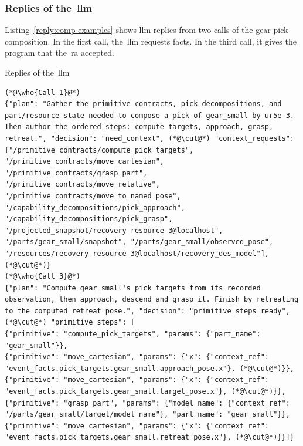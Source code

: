 \subsubsection{Replies of the~\texorpdfstring{\gls{llm}}{LLM}}\label{sec:comp-replies}

Listing~\ref{reply:comp-examples} shows \gls{llm} replies from two calls of the gear pick composition.
In the first call, the~\gls{llm} requests facts. In the third call, it gives the program that the~\gls{ra}
accepted.

\begin{recbox}{Replies of the~\gls{llm}}
\begin{lstlisting}
(*@\who{Call 1}@*)
{"plan": "Gather the primitive contracts, pick decompositions, and part/resource state needed to compose a pick of gear_small by ur5e-3. Then author the ordered steps: compute targets, approach, grasp, retreat.", "decision": "need_context", (*@\cut@*) "context_requests": ["/primitive_contracts/compute_pick_targets", "/primitive_contracts/move_cartesian", "/primitive_contracts/grasp_part", "/primitive_contracts/move_relative", "/primitive_contracts/move_to_named_pose", "/capability_decompositions/pick_approach", "/capability_decompositions/pick_grasp", "/projected_snapshot/recovery-resource-3@localhost", "/parts/gear_small/snapshot", "/parts/gear_small/observed_pose", "/resources/recovery-resource-3@localhost/recovery_des_model"], (*@\cut@*)}
(*@\who{Call 3}@*)
{"plan": "Compute gear_small's pick targets from its recorded observation, then approach, descend and grasp it. Finish by retreating to the computed retreat pose.", "decision": "primitive_steps_ready", (*@\cut@*) "primitive_steps": [
{"primitive": "compute_pick_targets", "params": {"part_name": "gear_small"}},
{"primitive": "move_cartesian", "params": {"x": {"context_ref": "event_facts.pick_targets.gear_small.approach_pose.x"}, (*@\cut@*)}},
{"primitive": "move_cartesian", "params": {"x": {"context_ref": "event_facts.pick_targets.gear_small.target_pose.x"}, (*@\cut@*)}},
{"primitive": "grasp_part", "params": {"model_name": {"context_ref": "/parts/gear_small/target/model_name"}, "part_name": "gear_small"}},
{"primitive": "move_cartesian", "params": {"x": {"context_ref": "event_facts.pick_targets.gear_small.retreat_pose.x"}, (*@\cut@*)}}]}
\end{lstlisting}
\end{recbox}
